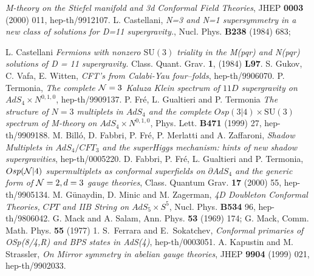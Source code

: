 \documentclass[a4paper,12pt]{article}
\def\n010{N^{0,1,0}}
\begin{document}
\begin{thebibliography}{99}
{\it M-theory
on the Stiefel manifold and 3d Conformal Field Theories}, JHEP
{\bf 0003} (2000) 011, hep-th/9912107.
 L. Castellani, {\it N=3 and N=1 supersymmetry in a
 new class of solutions for D=11 supergravity.}, Nucl. Phys.
 {\bf B238} (1984) 683;
 \par L. Castellani {\it Fermions with nonzero $\mathrm{SU(3)}$ triality in the
 M(pqr) and N(pqr) solutions of D = 11 supergravity.} Class. Quant. Grav.
 {\bf 1}, (1984) {\bf L97}.
 S. Gukov, C. Vafa, E. Witten, {\it CFT's from
 Calabi-Yau four--folds}, hep-th/9906070.
 P. Termonia, {\it The complete $ {\cal N} =3$ Kaluza Klein spectrum
 of $11D$ supergravity on $AdS_4\times \n010$}, hep-th/9909137.
 P. Fr\'e, L. Gualtieri and P. Termonia {\it The
 structure of $N=3$ multiplets in $AdS_4$ and the complete
 $Osp(3\vert4 )\times \mathrm{SU(3)}$ spectrum of M-theory on
 $AdS_4\times \n010$}, Phys. Lett. {\bf B471} (1999) 27, hep-th/9909188.
 M. Bill\'o, D. Fabbri, P. Fr\'e, P. Merlatti and A. Zaffaroni,
{\it Shadow Multiplets in $AdS_4/CFT_3$ and the superHiggs mechanism:
hints of new shadow supergravities}, hep-th/0005220.
D. Fabbri, P. Fr\'e, L. Gualtieri and P. Termonia,
 {\it $Osp({\cal N}\vert 4)$ supermultiplets as conformal superfields on
 $\partial AdS_4$ and the generic form of ${\cal N}=2, d=3$
 gauge theories}, Class. Quantum Grav. {\bf 17} (2000) 55, hep-th/9905134.
 M. G\"unaydin, D. Minic and M. Zagerman,
 {\it 4D Doubleton Conformal Theories,} $CPT$
 {\it and IIB String on} $AdS_5\times S^5$, Nucl. Phys. {\bf B534}
 96, hep-th/9806042.
 G. Mack and A. Salam, Ann. Phys. {\bf 53} (1969) 174;
 G. Mack, Comm. Math. Phys. {\bf 55} (1977) 1.
S.~Ferrara and E.~Sokatchev,
{\it Conformal primaries of OSp(8/4,R) and BPS states in AdS(4)}, hep-th/0003051.
 A. Kapustin and M. Strassler, {\it On Mirror symmetry
 in abelian gauge theories}, JHEP {\bf 9904} (1999) 021, hep-th/9902033.
\end{thebibliography}
\end{document}
